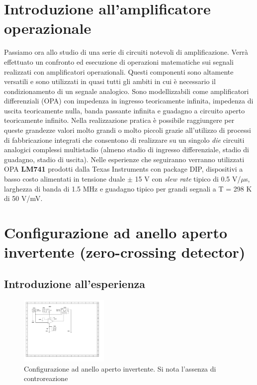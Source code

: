 \documentclass[journal]{IEEEtran}
\begin{document}
\section{\textbf{Introduzione all'amplificatore operazionale}}
Passiamo ora allo studio di una serie di circuiti notevoli di amplificazione. Verrà effettuato un confronto ed esecuzione di operazioni matematiche sui segnali realizzati con amplificatori operazionali. Questi componenti sono altamente versatili e sono utilizzati in quasi tutti gli ambiti in cui è necessario il condizionamento di un segnale analogico. Sono modellizzabili come amplificatori differenziali (OPA) con impedenza in ingresso teoricamente infinita, impedenza di uscita teoricamente nulla, banda passante infinita e guadagno a circuito aperto teoricamente infinito. Nella realizzazione pratica è possibile raggiungere per queste grandezze valori molto grandi o molto piccoli grazie all'utilizzo di processi di fabbricazione integrati che consentono di realizzare su un singolo \textit{die} circuiti analogici complessi multistadio (almeno stadio di ingresso differenziale, stadio di guadagno, stadio di uscita). Nelle esperienze che seguiranno verranno utilizzati OPA \textbf{LM741} prodotti dalla Texas Instruments con package DIP, dispositivi a basso costo alimentati in tensione duale $\pm$ 15 V con \textit{slew rate} tipico di 0.5 V/$\mu$s, larghezza di banda di 1.5 MHz e guadagno tipico per grandi segnali a T = 298 K di 50 V/mV. \cite{H}

\section{\textbf{Configurazione ad anello aperto invertente (zero-crossing detector)}} %
\subsection{\textbf{Introduzione all'esperienza}}
\begin{figure}[h]%
\begin {center}
\includegraphics[width=0.38\textwidth]{sch-simulations/output/opa-open-loop-inverting.pdf}
\caption{Configurazione ad anello aperto invertente. Si nota l'assenza di controreazione}
\label{fig:circ_open_loop_inv}
\end {center}
\end{figure}
\end{document}
